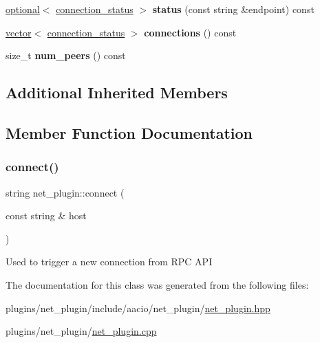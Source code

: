 \begin{DoxyCompactItemize}
\item 
\mbox{\label{classaacio_1_1net__plugin_a7a6f179d5d71123f6230f3884d2b053d}} 
\mbox{\hyperlink{classaacio_1_1optional}{optional}}$<$ \mbox{\hyperlink{structaacio_1_1connection__status}{connection\+\_\+status}} $>$ {\bfseries status} (const string \&endpoint) const
\item 
\mbox{\label{classaacio_1_1net__plugin_a09dd5b5e202a445338df546d3faf4166}} 
\mbox{\hyperlink{classstd_1_1vector}{vector}}$<$ \mbox{\hyperlink{structaacio_1_1connection__status}{connection\+\_\+status}} $>$ {\bfseries connections} () const
\item 
\mbox{\label{classaacio_1_1net__plugin_a3a14fde27200b4344b8cde06174f23f9}} 
size\+\_\+t {\bfseries num\+\_\+peers} () const
\end{DoxyCompactItemize}
\subsection*{Additional Inherited Members}


\subsection{Member Function Documentation}
\mbox{\label{classaacio_1_1net__plugin_a1aef72e3644635d726c05994125de598}} 
\subsubsection{\texorpdfstring{connect()}{connect()}}
{\footnotesize\ttfamily string net\+\_\+plugin\+::connect (\begin{DoxyParamCaption}\item[{const string \&}]{host }\end{DoxyParamCaption})}

Used to trigger a new connection from R\+PC A\+PI 

The documentation for this class was generated from the following files\+:\begin{DoxyCompactItemize}
\item 
plugins/net\+\_\+plugin/include/aacio/net\+\_\+plugin/\mbox{\hyperlink{net__plugin_8hpp}{net\+\_\+plugin.\+hpp}}\item 
plugins/net\+\_\+plugin/\mbox{\hyperlink{net__plugin_8cpp}{net\+\_\+plugin.\+cpp}}\end{DoxyCompactItemize}

